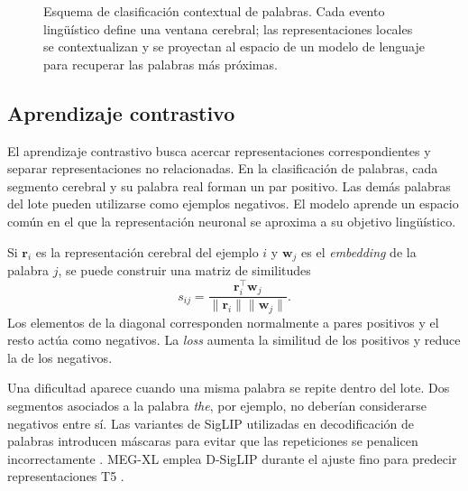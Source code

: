 \begin{figure}[htbp]
{}
    \caption{Esquema de clasificación contextual de palabras. Cada evento lingüístico define una ventana cerebral; las representaciones locales se contextualizan y se proyectan al espacio de un modelo de lenguaje para recuperar las palabras más próximas.}
    \label{fig:contextual_word_decoding}
\end{figure}

\subsection{Aprendizaje contrastivo}

El aprendizaje contrastivo busca acercar representaciones correspondientes y separar representaciones no relacionadas. En la clasificación de palabras, cada segmento cerebral y su palabra real forman un par positivo. Las demás palabras del lote pueden utilizarse como ejemplos negativos. El modelo aprende un espacio común en el que la representación neuronal se aproxima a su objetivo lingüístico.

Si \(\mathbf{r}_i\) es la representación cerebral del ejemplo \(i\) y \(\mathbf{w}_j\) es el \textit{embedding} de la palabra \(j\), se puede construir una matriz de similitudes
\[
    s_{ij} =
    \frac{\mathbf{r}_i^{\top}\mathbf{w}_j}
    {\lVert\mathbf{r}_i\rVert\lVert\mathbf{w}_j\rVert}.
\]
Los elementos de la diagonal corresponden normalmente a pares positivos y el resto actúa como negativos. La \textit{loss} aumenta la similitud de los positivos y reduce la de los negativos.

Una dificultad aparece cuando una misma palabra se repite dentro del lote. Dos segmentos asociados a la palabra \textit{the}, por ejemplo, no deberían considerarse negativos entre sí. Las variantes de SigLIP utilizadas en decodificación de palabras introducen máscaras para evitar que las repeticiones se penalicen incorrectamente \cite{zhai2023siglip,dascoli2024words}. MEG-XL emplea D-SigLIP durante el ajuste fino para predecir representaciones T5 \cite{jayalath2026megxl}.

